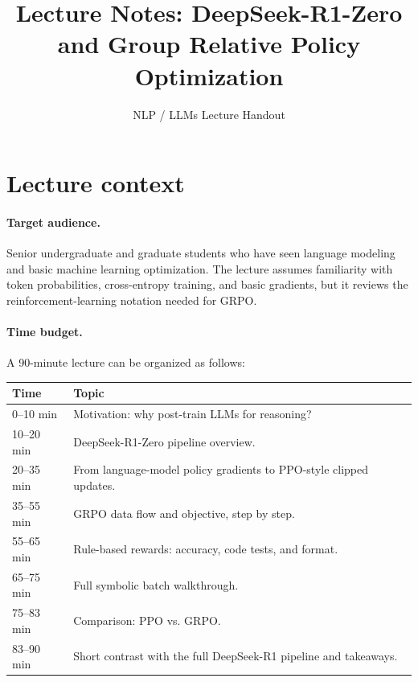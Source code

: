 \documentclass[11pt]{article}
\title{Lecture Notes: DeepSeek-R1-Zero and Group Relative Policy Optimization}
\author{NLP / LLMs Lecture Handout}
\date{}
\begin{document}
\maketitle

\section*{Lecture context}

\paragraph{Target audience.}
Senior undergraduate and graduate students who have seen language modeling and basic machine learning optimization. The lecture assumes familiarity with token probabilities, cross-entropy training, and basic gradients, but it reviews the reinforcement-learning notation needed for GRPO.

\paragraph{Time budget.}
A 90-minute lecture can be organized as follows:

\begin{center}
\begin{tabular}{@{}p{}p{}@{}}
\toprule
Time & Topic \\
\midrule
0--10 min & Motivation: why post-train LLMs for reasoning? \\
10--20 min & DeepSeek-R1-Zero pipeline overview. \\
20--35 min & From language-model policy gradients to PPO-style clipped updates. \\
35--55 min & GRPO data flow and objective, step by step. \\
55--65 min & Rule-based rewards: accuracy, code tests, and format. \\
65--75 min & Full symbolic batch walkthrough. \\
75--83 min & Comparison: PPO vs. GRPO. \\
83--90 min & Short contrast with the full DeepSeek-R1 pipeline and takeaways. \\
\bottomrule
\end{tabular}
\end{center}
\end{document}
